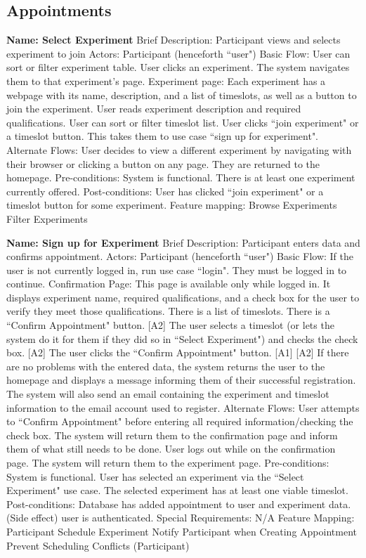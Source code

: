 \subsection{Appointments}
\begin{outline}[enumerate]
\1 {\bf Name: Select Experiment}
\2 Brief Description: Participant views and selects experiment to join
\2 Actors: Participant (henceforth ``user")
\2 Basic Flow:
\3 User can sort or filter experiment table.
\3 User clicks an experiment.  The system navigates them to that experiment's page.
\3 Experiment page: Each experiment has a webpage with its name, description, and a list of timeslots, as well as a button to join the experiment.
\3 User reads experiment description and required qualifications.
\3 User can sort or filter timeslot list.
\3 User clicks ``join experiment" or a timeslot button.  This takes them to use case ``sign up for experiment".
\2 Alternate Flows:
\3 [A1] User decides to view a different experiment by navigating with their browser or clicking a button on any page.  They are returned to the homepage.
\2 Pre-conditions:
\3 System is functional.
\3 There is at least one experiment currently offered.
\2 Post-conditions:
\3 User has clicked ``join experiment" or a timeslot button for some experiment.
\2 Feature mapping:
\3 Browse Experiments
\3 Filter Experiments

\1 {\bf Name: Sign up for Experiment}
\2 Brief Description: Participant enters data and confirms appointment.
\2 Actors: Participant (henceforth ``user")
\2 Basic Flow:
\3 If the user is not currently logged in, run use case ``login".  They must be logged in to continue.
\3 Confirmation Page: This page is available only while logged in.  It displays experiment name, required qualifications, and a check box for the user to verify they meet those qualifications. There is a list of timeslots. There is a ``Confirm Appointment" button. [A2]
\3 The user selects a timeslot (or lets the system do it for them if they did so in ``Select Experiment") and checks the check box. [A2]
\3 The user clicks the ``Confirm Appointment" button. [A1] [A2]
\3 If there are no problems with the entered data, the system returns the user to the homepage and displays a message informing them of their successful registration.  The system will also send an email containing the experiment and timeslot information to the email account used to register.
\2 Alternate Flows:
\3 [A1] User attempts to ``Confirm Appointment" before entering all required information/checking the check box.
\4 The system will return them to the confirmation page and inform them of what still needs to be done.
\3 [A2] User logs out while on the confirmation page.  The system will return them to the experiment page.
\2 Pre-conditions:
\3 System is functional.
\3 User has selected an experiment via the ``Select Experiment" use case.
\3 The selected experiment has at least one viable timeslot.
\2 Post-conditions:
\3 Database has added appointment to user and experiment data.
\3 (Side effect) user is authenticated.
\2 Special Requirements:
\3 N/A
\2 Feature Mapping:
\3 Participant Schedule Experiment
\3 Notify Participant when Creating Appointment
\3 Prevent Scheduling Conflicts (Participant)
\end{outline}

